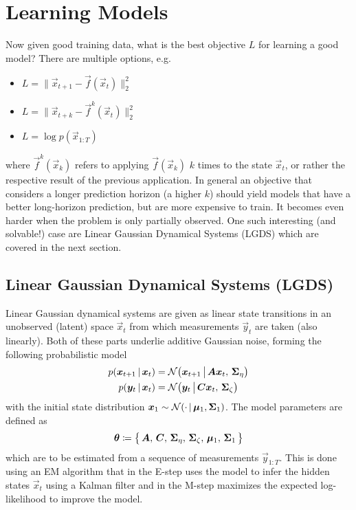 	\section{Learning Models}
		Now given good training data, what is the best objective \(L\) for learning a good model? There are multiple options, e.g.
		\begin{itemize}
			\item {}           \( L = \big\lVert \vec{x}_{t + 1} - \vec{f}(\vec{x}_t) \big\rVert_2^2 \)
			\item {}         \( L = \big\lVert \vec{x}_{t + k} - \vec{f}^k(\vec{x}_t) \big\rVert_2^2 \)
			\item {} \( L = \log p(\vec{x}_{1:T}) \)
		\end{itemize}
		where \( \vec{f}^k(\vec{x}_k) \) refers to applying \( \vec{f}(\vec{x}_k) \) \(k\) times to the state \( \vec{x}_t \), or rather the respective result of the previous application. In general an objective that considers a longer prediction horizon (a higher \(k\)) should yield models that have a better long-horizon prediction, but are more expensive to train. It becomes even harder when the problem is only partially observed. One such interesting (and solvable!) case are Linear Gaussian Dynamical Systems (LGDS) which are covered in the next section.

		\subsection{Linear Gaussian Dynamical Systems (LGDS)}
			\label{subsec:lgds}

			Linear Gaussian dynamical systems are given as linear state transitions in an unobserved (latent) space \(\vec{x}_t\) from which measurements \(\vec{y}_t\) are taken (also linearly). Both of these parts underlie additive Gaussian noise, forming the following probabilistic model
			\begin{align*}
				p(\bm{x}_{t + 1} \,\vert\, \bm{x}_t) & = \mathcal{N}\big( \bm{x}_{t + 1} \,\big\vert\, \bm{A} \bm{x}_t,\, \bm{\Sigma}_\eta \big) \\
				p(\bm{y}_t \,\vert\, \bm{x}_t)       & = \mathcal{N}\big( \bm{y}_t \,\big\vert\, \bm{C} \bm{x}_t,\, \bm{\Sigma}_\zeta \big)
			\end{align*}
			with the initial state distribution \( \bm{x}_1 \sim \mathcal{N}(\cdot \,\vert\, \bm{\mu}_1, \bm{\Sigma}_1) \). The model parameters are defined as
			\begin{equation*}
				\bm{\theta} \coloneqq \big\{\, \bm{A},\, \bm{C},\, \bm{\Sigma}_\eta,\, \bm{\Sigma}_\zeta,\, \bm{\mu}_1,\, \bm{\Sigma}_1 \,\big\}
			\end{equation*}
			which are to be estimated from a sequence of measurements \( \vec{y}_{1:T} \). This is done using an EM algorithm that in the E-step uses the model to infer the hidden states \(\vec{x}_t\) using a Kalman filter and in the M-step maximizes the expected log-likelihood to improve the model.

